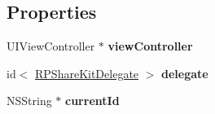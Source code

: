 \subsection*{Properties}
\begin{DoxyCompactItemize}
\item 
\hypertarget{interface_r_p_share_kit_a0c40ac4214b1b0f7c08473c2f64a97cf}{U\-I\-View\-Controller $\ast$ {\bfseries view\-Controller}}\label{interface_r_p_share_kit_a0c40ac4214b1b0f7c08473c2f64a97cf}

\item 
\hypertarget{interface_r_p_share_kit_a723e8748605b7e81d7b95e35ff1626c2}{id$<$ \hyperlink{protocol_r_p_share_kit_delegate-p}{R\-P\-Share\-Kit\-Delegate} $>$ {\bfseries delegate}}\label{interface_r_p_share_kit_a723e8748605b7e81d7b95e35ff1626c2}

\item 
\hypertarget{interface_r_p_share_kit_a3060b4f821e3c126922b04e23a1fd82d}{N\-S\-String $\ast$ {\bfseries current\-Id}}\label{interface_r_p_share_kit_a3060b4f821e3c126922b04e23a1fd82d}

\end{DoxyCompactItemize}
